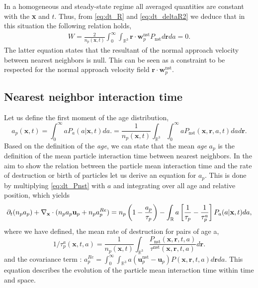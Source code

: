 In a homogeneous and steady-state regime all averaged quantities are constant with the \textbf{x} and $t$.   
Thus, from \ref{eq:dt_R} and \ref{eq:dt_deltaR2} we deduce that in this situation the following relation holds, 
\begin{align}
    W = \frac{2}{n_p(\textbf{x},t)}
    \int_{0}^\infty
    \int_{\mathbb{R}^3} 
        \textbf{r} \cdot \textbf{w}^\text{nst}_p
    P_\text{nst}
    d\textbf{r}
    da = 0. 
    \label{eq:cdt_for_W}
\end{align}
The latter equation states that the resultant of the normal approach velocity between nearest neighbors is null. 
This can be seen as a constraint to be respected for the normal approach velocity field $\textbf{r}\cdot \textbf{w}_p^\text{nst}$. 



\subsection{Nearest neighbor interaction time}

Let us define the first moment of the age distribution,
\begin{equation}
    a_p(\textbf{x},t) 
    = \int_{0}^{\infty} a P_a(a|\textbf{x},t) da. 
    = \frac{1}{n_p(\textbf{x},t)}
    \int_{\mathbb{R}^3}
    \int_{0}^{\infty} 
    a P_\text{nst}(\textbf{x},\textbf{r},a,t) da d\textbf{r}. 
    \label{eq:a_p}
\end{equation}
Based on the definition of the \textit{age}, we can state that the mean \textit{age} $a_p$ is the definition of the mean particle interaction time between nearest neighbors.  
In the aim to show the relation between the particle mean interaction time and the rate of destruction or birth of particles let us derive an equation for $a_p$. 
This is done by multiplying \ref{eq:dt_Pnst} with $a$ and integrating over all age and relative position, which yields
\begin{equation}
    \pddt (n_p a_p)
    + \pddx \cdot  (n_p a_p \textbf{u}_p + n_p a_p^{Re})
    = 
    n_p\left(1
    - \frac{a_p}{\tau_p}\right)
    - \int_{\mathbb{R}} a \left[
        \frac{1}{\tau_p}
        - \frac{1}{\tau_p^a}
    \right]P_a(a|\textbf{x},t) da,
    \label{eq:dt_a_p}
\end{equation}
where we have defined, the mean rate of destruction for pairs of age a, 
\begin{equation*}
    1/\tau_p^a(\textbf{x},t,a) 
    = \frac{1}{n_p(\textbf{x},t)}\int_{\mathbb{R}^3} \frac{P_\text{nst}(\textbf{x},\textbf{r},t,a)}{\tau^\text{nst}(\textbf{x},\textbf{r},t,a)} d\textbf{r}.
\end{equation*}
and the covariance term : $a^{Re}_p = \int_{0}^\infty\int_{\mathbb{R}^3} a (\textbf{u}^\text{nst}_p - \textbf{u}_p) P(\textbf{x},\textbf{r},t,a) d\textbf{r}da$. 
This equation describes the evolution of the particle mean interaction time within time and space. 

